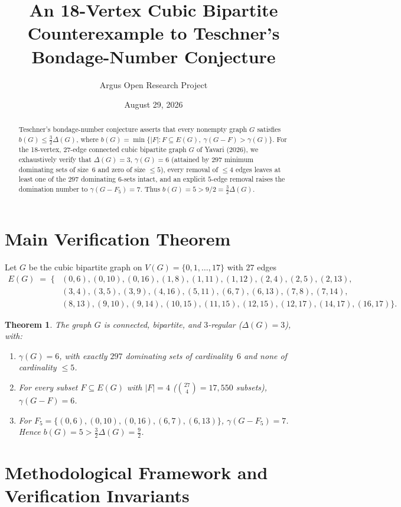 \documentclass[10pt,reqno]{amsart}
\title[An 18-Vertex Cubic Bipartite Counterexample to Teschner's Conjecture]
{An 18-Vertex Cubic Bipartite Counterexample to Teschner's Bondage-Number Conjecture}
\author{Argus Open Research Project}
\date{August 29, 2026}
\newtheorem{theorem}{Theorem}[section]
\theoremstyle{definition}
\begin{document}
\begin{abstract}
Teschner's bondage-number conjecture asserts that every nonempty graph $G$ satisfies $b(G)\le \frac{3}{2}\Delta(G)$, where $b(G)=\min\{|F| : F\subseteq E(G),\ \gamma(G-F)>\gamma(G)\}$. For the 18-vertex, 27-edge connected cubic bipartite graph $G$ of Yavari (2026), we exhaustively verify that $\Delta(G)=3$, $\gamma(G)=6$ (attained by $297$ minimum dominating sets of size~$6$ and zero of size $\le 5$), every removal of $\le 4$ edges leaves at least one of the $297$ dominating $6$-sets intact, and an explicit $5$-edge removal raises the domination number to $\gamma(G-F_5)=7$. Thus $b(G)=5 > 9/2 = \frac{3}{2}\Delta(G)$.
\end{abstract}
\maketitle
\section{Main Verification Theorem}
Let $G$ be the cubic bipartite graph on $V(G)=\{0,1,\dots,17\}$ with $27$ edges
\begin{align*}
  E(G) \;=\; \bigl\{&(0,6),(0,10),(0,16),(1,8),(1,11),(1,12),(2,4),(2,5),(2,13),\\
  &(3,4),(3,5),(3,9),(4,16),(5,11),(6,7),(6,13),(7,8),(7,14),\\
  &(8,13),(9,10),(9,14),(10,15),(11,15),(12,15),(12,17),(14,17),(16,17)\bigr\}.
\end{align*}
\begin{theorem}
The graph $G$ is connected, bipartite, and $3$-regular ($\Delta(G)=3$), with:
\begin{enumerate}[label=\textup{(\arabic*)}]
  \item $\gamma(G)=6$, with exactly $297$ dominating sets of cardinality~$6$ and none of cardinality $\le 5$.
  \item For every subset $F\subseteq E(G)$ with $|F|=4$ ($\binom{27}{4}=17{,}550$ subsets), $\gamma(G-F)=6$.
  \item For $F_5=\{(0,6),(0,10),(0,16),(6,7),(6,13)\}$, $\gamma(G-F_5)=7$. Hence $b(G)=5 > \frac{3}{2}\Delta(G)=\frac{9}{2}$.
\end{enumerate}
\end{theorem}

\section{Methodological Framework and Verification Invariants}
\end{document}
